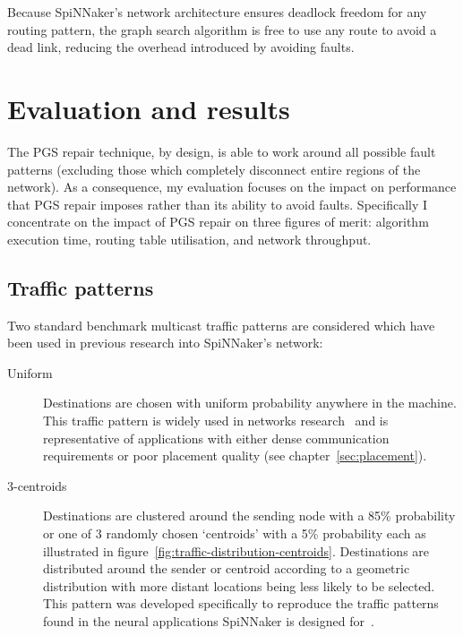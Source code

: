 		Because SpiNNaker's network architecture ensures deadlock freedom for any
		routing pattern, the graph search algorithm is free to use any route to
		avoid a dead link, reducing the overhead introduced by avoiding faults.
		
	\section{Evaluation and results}
		
		\label{sec:routing-evaluation}
		
		The PGS repair technique, by design, is able to work around all possible
		fault patterns (excluding those which completely disconnect entire regions
		of the network). As a consequence, my evaluation focuses on the impact on
		performance that PGS repair imposes rather than its ability to avoid
		faults.  Specifically I concentrate on the impact of PGS repair on three
		figures of merit: algorithm execution time, routing table utilisation, and
		network throughput.
		
		\subsection{Traffic patterns}
			
			Two standard benchmark multicast traffic patterns are considered which
			have been used in previous research into SpiNNaker's network:
			
			\begin{description}
				
				\item[Uniform] Destinations are chosen with uniform probability
				anywhere in the machine. This traffic pattern is widely used in
				networks research~\cite[chapter~23]{dally04} and is representative of
				applications with either dense communication requirements or poor
				placement quality (see chapter~\ref{sec:placement}).
				
				\item[3-centroids] Destinations are clustered around the sending node
				with a 85\% probability or one of 3 randomly chosen `centroids' with a
				5\% probability each as illustrated in
				figure~\ref{fig:traffic-distribution-centroids}.  Destinations are
				distributed around the sender or centroid according to a geometric
				distribution with more distant locations being less likely to be
				selected.  This pattern was developed specifically to reproduce the
				traffic patterns found in the neural applications SpiNNaker is designed
				for~\cite{navaridas14}.
				
			\end{description}
			
